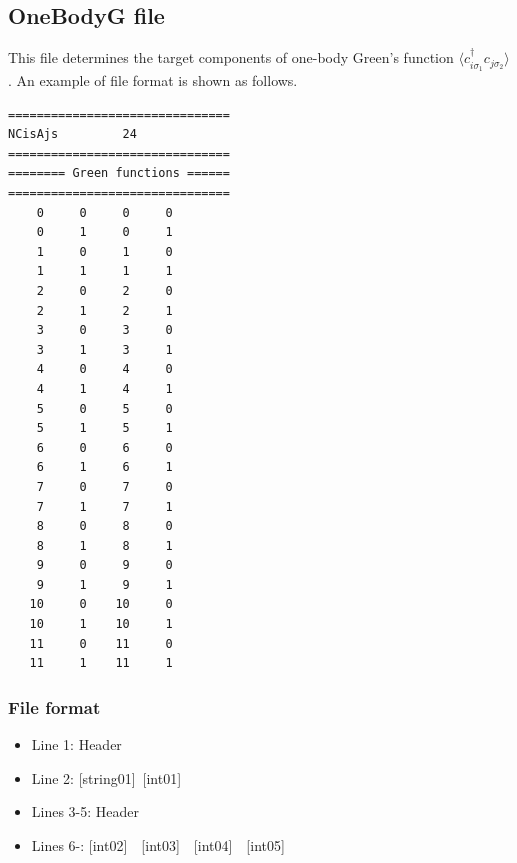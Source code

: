 \newpage
\subsection{OneBodyG file}
\label{Subsec:onebodyg}
This file determines the target components of one-body Green's function $\langle c_{i\sigma_1}^{\dagger}c_{j\sigma_2}\rangle$. An example of file format is shown as follows.

\begin{minipage}{12.5cm}
\begin{screen}
\begin{verbatim}
===============================
NCisAjs         24
===============================
======== Green functions ======
===============================
    0     0     0     0
    0     1     0     1
    1     0     1     0
    1     1     1     1
    2     0     2     0
    2     1     2     1
    3     0     3     0
    3     1     3     1
    4     0     4     0
    4     1     4     1
    5     0     5     0
    5     1     5     1
    6     0     6     0
    6     1     6     1
    7     0     7     0
    7     1     7     1
    8     0     8     0
    8     1     8     1
    9     0     9     0
    9     1     9     1
   10     0    10     0
   10     1    10     1
   11     0    11     0
   11     1    11     1
\end{verbatim}
\end{screen}
\end{minipage}

\subsubsection{File format}
 \begin{itemize}
   \item  Line 1:  Header
   \item  Line 2:   [string01]~[int01]
   \item  Lines 3-5:  Header
   \item  Lines 6-: 
  [int02]~~[int03]~~[int04]~~[int05]
  \end{itemize}
